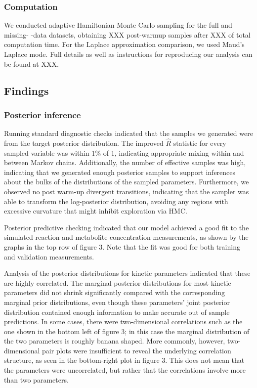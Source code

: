 \documentclass[journal=,manuscript=]{achemso}
\begin{document}
\hypertarget{computation}{%
\subsubsection{Computation}\label{computation}}

We conducted adaptive Hamiltonian Monte Carlo sampling for the full and
missing- -data datasets, obtaining XXX post-warmup samples after XXX of
total computation time. For the Laplace approximation comparison, we
used Maud's Laplace mode. Full details as well as instructions for
reproducing our analysis can be found at XXX.

\hypertarget{findings}{%
\subsection{Findings}\label{findings}}

\hypertarget{posterior-inference}{%
\subsubsection{Posterior inference}\label{posterior-inference}}

Running standard diagnostic checks indicated that the samples we
generated were from the target posterior distribution. The improved
\(\hat{R}\) statistic
\citep{vehtariRankNormalizationFoldingLocalization2021} for every
sampled variable was within 1\% of 1, indicating appropriate mixing
within and between Markov chains. Additionally, the number of effective
samples was high, indicating that we generated enough posterior samples
to support inferences about the bulks of the distributions of the
sampled parameters. Furthermore, we observed no post warm-up divergent
transitions, indicating that the sampler was able to transform the
log-posterior distribution, avoiding any regions with excessive
curvature that might inhibit exploration via HMC.

Posterior predictive checking indicated that our model achieved a good
fit to the simulated reaction and metabolite concentration measurements,
as shown by the graphs in the top row of figure 3. Note that the fit was
good for both training and validation measurements.

Analysis of the posterior distributions for kinetic parameters indicated
that these are highly correlated. The marginal posterior distributions
for most kinetic parameters did not shrink significantly compared with
the corresponding marginal prior distributions, even though these
parameters' joint posterior distribution contained enough information to
make accurate out of sample predictions. In some cases, there were
two-dimensional correlations such as the one shown in the bottom left of
figure 3; in this case the marginal distribution of the two parameters
is roughly banana shaped. More commonly, however, two-dimensional pair
plots were insufficient to reveal the underlying correlation structure,
as seen in the bottom-right plot in figure 3. This does not mean that
the parameters were uncorrelated, but rather that the correlations
involve more than two parameters.
\end{document}
